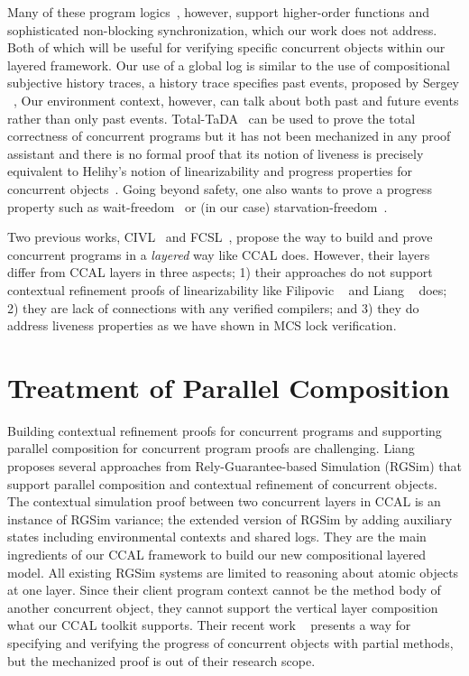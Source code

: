 Many of these program logics~\cite{Turon13popl,iris15}, however, support 
higher-order functions 
and sophisticated non-blocking synchronization,
which our work does not address.
Both of which will be
useful for verifying specific concurrent objects within our layered
framework. 
Our use of a global log is similar to the use of compositional
subjective history traces, a history trace specifies past events, proposed by Sergey \etal~\cite{sergey15},
Our environment context, however, can talk about both past and future events rather than only past events.
Total-TaDA~\cite{pinto16} can be used to prove
the total correctness of concurrent programs but it has not been
mechanized in any proof assistant and there is no formal proof that
its notion of liveness is precisely equivalent to Helihy's notion of
linearizability and progress properties for concurrent
objects~\cite{Herlihy08book}. 
Going
beyond safety, one also wants to prove a progress property such as
wait-freedom~\cite{herlihy91:waitfree} or (in our case)
starvation-freedom~\cite{Herlihy08book}.

Two previous works, CIVL~\cite{civl15} and FCSL~\cite{sergey15pldi},
propose the way to build and prove concurrent programs in a \textit{layered} way like CCAL does. 
However, their layers differ from CCAL layers in three aspects;
1) their approaches do not support contextual refinement proofs of linearizability like Filipovic \etal~\cite{filipovic10} and Liang \etal~\cite{liang13} does;
2) they are lack of connections with any verified compilers; and
3) they do address liveness properties as we have shown in MCS lock verification.




\section{Treatment of Parallel Composition}

Building contextual refinement proofs for concurrent programs and supporting parallel composition for concurrent program proofs 
are challenging.
Liang \etal~\cite{RGSim,Liang14lics,lili16, liang:2017} 
proposes several approaches from Rely-Guarantee-based Simulation (RGSim) 
that support parallel
composition and  contextual refinement of concurrent
objects.
The contextual simulation proof between two concurrent layers in CCAL 
is an instance of RGSim variance; the extended version of RGSim by adding auxiliary states including environmental contexts and shared logs. 
They are the main ingredients of our CCAL framework 
to build our new  compositional
layered model.
All existing RGSim systems are limited to reasoning
about atomic objects at one layer.
Since their client program context cannot 
be the method body of another concurrent object, 
they cannot
support the vertical layer composition what our CCAL toolkit supports.
Their recent work \etal~\cite{liang:2017} presents a way for specifying and verifying the progress of concurrent objects with partial methods, but the mechanized proof is out of their research scope. 


